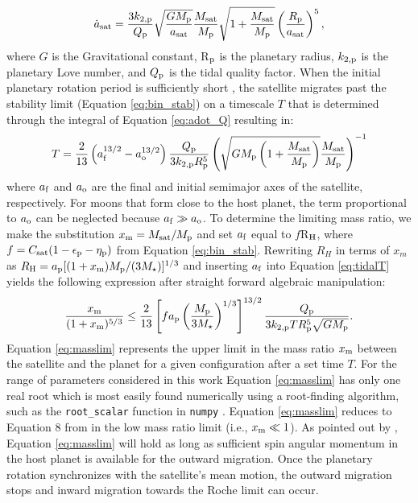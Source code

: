 \documentclass[preprint]{aastex63}
\begin{document}
\begin{equation}\label{eq:adot_Q}
    \dot{a}_{\rm sat} = \frac{3 k_{\rm 2,p}}{Q_{\rm p}}
    \sqrt{\frac{GM_{\rm p}}{a_{\rm sat}}}
    \frac{M_{\rm sat}}{M_{\rm p}}
    \sqrt{1+\frac{M_{\rm sat}}{M_{\rm p}}}
    \left(\frac{R_{\rm p}}{a_{\rm sat}}\right)^5,
\end{equation}
where $G$ is the Gravitational constant, R$_{\rm p}$ is the planetary radius, $k_{\rm 2,p}$ is the planetary Love number, and $Q_{\rm p}$ is the tidal quality factor.  When the initial planetary rotation period is sufficiently short \citep{Piro2018}, the satellite migrates past the stability limit (Equation \ref{eq:bin_stab}) on a timescale $T$ that is determined through the integral of Equation \ref{eq:adot_Q} resulting in:
\begin{equation}
T = \frac{2}{13}\left(a_{\rm f}^{13/2} - a_{\rm o}^{13/2} \right)\frac{Q_{\rm p}}{3k_{\rm 2,p}R_{\rm p}^5} \left(\sqrt{GM_{\rm p}\left(1+\frac{M_{\rm sat}}{M_{\rm p}}\right)} \frac{M_{\rm sat}}{M_{\rm p}} \right )^{-1}
\label{eq:tidalT}
\end{equation}
where $a_{\rm f}$ and $a_{\rm o}$ are the final and initial semimajor axes of the satellite, respectively.  For moons that form close to the host planet, the term proportional to $a_{\rm o}$ can be neglected because $a_{\rm f} \gg a_{\rm o}$.  To determine the limiting mass ratio, we make the substitution $x_{\rm m} = M_{\rm sat}/M_{\rm p}$ and set $a_{\rm f}$ equal to $f$R$_{\rm H}$, where $f=C_{\rm sat}(1-\epsilon_{\rm p} - \eta_{\rm p})$ from Equation \ref{eq:bin_stab}. Rewriting $R_H$ in terms of $x_m$ as  $R_{\rm H}=a_{\rm p}[(1+x_{\rm m})M_{\rm p}/(3M_\star)]^{1/3}$ and inserting $a_{\rm f}$ into Equation \ref{eq:tidalT} yields the following expression after straight forward algebraic manipulation:
\begin{equation} \label{eq:masslim}
    \frac{x_{\rm m}}{(1+x_{\rm m})^{5/3}} \leq \frac{2}{13}\left[ fa_{\rm p} \left(\frac{M_{\rm p}}{3M_\star}\right)^{1/3}\right ]^{13/2} \frac{Q_{\rm p}}{3k_{\rm 2,p}TR_{\rm p}^5\sqrt{GM_{\rm p}}}.
\end{equation}
Equation \ref{eq:masslim} represents the upper limit in the mass ratio $x_{\rm m}$ between the satellite and the planet for a given configuration after a set time $T$.
For the range of parameters considered in this work Equation \ref{eq:masslim} has only one real root which is most easily found numerically using a root-finding algorithm, such as the \verb|root_scalar| function in \texttt{numpy} \citep{Harris2020}. Equation \ref{eq:masslim}  reduces to Equation 8 from \cite{Barnes2002} in the low mass ratio limit (i.e., $x_{\rm m} \ll 1$).  As pointed out by \cite{Piro2018}, Equation \ref{eq:masslim} will hold as long as sufficient spin angular momentum in the host planet is available for the outward migration.  Once the planetary rotation synchronizes with the satellite's mean motion, the outward migration stops and inward migration towards the Roche limit can occur.  
\end{document}
